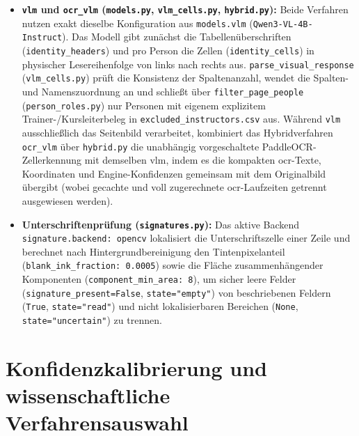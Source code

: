 \begin{itemize}
  \item \textbf{\texttt{vlm} und \texttt{ocr\_vlm} (\texttt{models.py}, \texttt{vlm\_cells.py}, \texttt{hybrid.py}):} Beide Verfahren nutzen exakt dieselbe Konfiguration aus \texttt{models.vlm} (\texttt{Qwen3-VL-4B-Instruct}). Das Modell gibt zunächst die Tabellenüberschriften (\texttt{identity\_headers}) und pro Person die Zellen (\texttt{identity\_cells}) in physischer Lesereihenfolge von links nach rechts aus. \texttt{parse\_visual\_response} (\texttt{vlm\_cells.py}) prüft die Konsistenz der Spaltenanzahl, wendet die Spalten- und Namenszuordnung an und schließt über \texttt{filter\_page\_people} (\texttt{person\_roles.py}) nur Personen mit eigenem explizitem Trainer-/Kursleiterbeleg in \texttt{excluded\_instructors.csv} aus. Während \texttt{vlm} ausschließlich das Seitenbild verarbeitet, kombiniert das Hybridverfahren \texttt{ocr\_vlm} über \texttt{hybrid.py} die unabhängig vorgeschaltete PaddleOCR-Zellerkennung mit demselben \ac{vlm}, indem es die kompakten \ac{ocr}-Texte, Koordinaten und Engine-Konfidenzen gemeinsam mit dem Originalbild übergibt (wobei gecachte und voll zugerechnete \ac{ocr}-Laufzeiten getrennt ausgewiesen werden).
  \item \textbf{Unterschriftenprüfung (\texttt{signatures.py}):} Das aktive Backend \texttt{signature.backend: opencv} lokalisiert die Unterschriftszelle einer Zeile und berechnet nach Hintergrundbereinigung den Tintenpixelanteil (\texttt{blank\_ink\_fraction: 0.0005}) sowie die Fläche zusammenhängender Komponenten (\texttt{component\_min\_area: 8}), um sicher leere Felder (\texttt{signature\_present=False}, \texttt{state="empty"}) von beschriebenen Feldern (\texttt{True}, \texttt{state="read"}) und nicht lokalisierbaren Bereichen (\texttt{None}, \texttt{state="uncertain"}) zu trennen.
\end{itemize}

\section{Konfidenzkalibrierung und wissenschaftliche Verfahrensauswahl}
\label{sec:umsetzung-kalibrierung}

